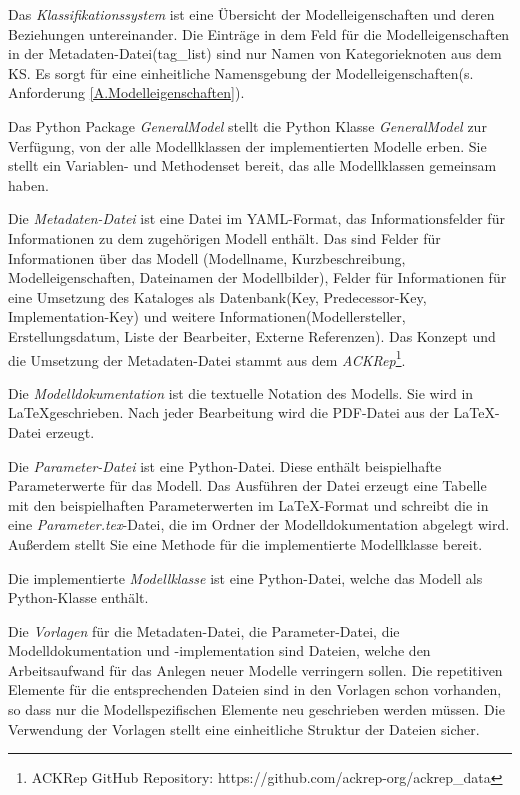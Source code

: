 Das \textit{Klassifikationssystem} ist eine Übersicht der Modelleigenschaften und deren Beziehungen untereinander. Die Einträge in dem Feld für die Modelleigenschaften in der Metadaten-Datei(tag\_list) sind nur Namen von Kategorieknoten aus dem KS. Es sorgt für eine einheitliche Namensgebung der Modelleigenschaften(s. Anforderung \ref{A.Modelleigenschaften}). 

Das Python Package \textit{GeneralModel} stellt die Python Klasse \textit{GeneralModel} zur Verfügung, von der alle Modellklassen der implementierten Modelle erben. Sie stellt ein Variablen- und Methodenset bereit, das alle Modellklassen gemeinsam haben.

Die \textit{Metadaten-Datei} ist eine Datei im YAML-Format, das Informationsfelder für Informationen zu dem zugehörigen Modell enthält. Das sind Felder für Informationen über das Modell (Modellname, Kurzbeschreibung, Modelleigenschaften, Dateinamen der Modellbilder), Felder für Informationen für eine Umsetzung des Kataloges als Datenbank(Key, Predecessor-Key, Implementation-Key) und weitere Informationen(Modellersteller, Erstellungsdatum, Liste der Bearbeiter, Externe Referenzen). Das Konzept und die Umsetzung der Metadaten-Datei stammt aus dem \textit{ACKRep}\footnote{ACKRep GitHub Repository: https://github.com/ackrep-org/ackrep\_data}.

Die \textit{Modelldokumentation} ist die textuelle Notation des Modells. Sie wird in \LaTeX geschrieben. Nach jeder Bearbeitung wird die PDF-Datei aus der \LaTeX-Datei erzeugt. 

Die \textit{Parameter-Datei} ist eine Python-Datei. Diese enthält beispielhafte Parameterwerte für das Modell. Das Ausführen der Datei erzeugt eine Tabelle mit den beispielhaften Parameterwerten im \LaTeX-Format und schreibt die in eine \textit{Parameter.tex}-Datei, die im Ordner der Modelldokumentation abgelegt wird. Außerdem stellt Sie eine Methode für die implementierte Modellklasse bereit.

Die implementierte \textit{Modellklasse} ist eine Python-Datei, welche das Modell als Python-Klasse enthält. 

Die \textit{Vorlagen} für die Metadaten-Datei, die Parameter-Datei, die Modelldokumentation und -implementation sind Dateien, welche den Arbeitsaufwand für das Anlegen neuer Modelle verringern sollen. Die repetitiven Elemente für die entsprechenden Dateien sind in den Vorlagen schon vorhanden, so dass nur die Modellspezifischen Elemente neu geschrieben werden müssen. Die Verwendung der Vorlagen stellt eine einheitliche Struktur der Dateien sicher.



